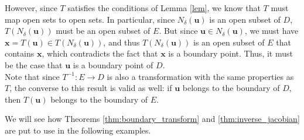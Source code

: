 However, since $T$ satisfies the conditions of Lemma \ref{lem}, we know that $T$ must map open sets to open sets. In particular, since $N_\delta(\mathbf{u})$ is an open subset of $D$, $T(N_\delta(\mathbf{u}))$ must be an open subset of $E$. But since $\mathbf{u}\in N_\delta(\mathbf{u})$, we must have $\mathbf{x} = T(\mathbf{u})\in T(N_\delta(\mathbf{u}))$, and thus $T(N_\delta(\mathbf{u}))$ is an open subset of $E$ that contains $\mathbf{x}$, which contradicts the fact that $\mathbf{x}$ is a boundary point. Thus, it must be the case that $\mathbf{u}$ is a boundary point of $D$.\\


Note that since $T^{-1}:E\to D$ is also a transformation with the same properties as $T$, the converse to this result is valid as well: if $\mathbf{u}$ belongs to the boundary of $D$, then $T(\mathbf{u})$ belongs to the boundary of $E$.

We will see how Theorems \ref{thm:boundary_transform} and \ref{thm:inverse_jacobian} are put to use in the following examples.\\


